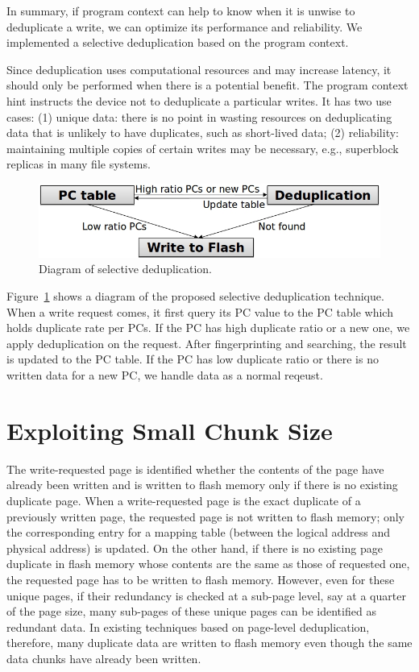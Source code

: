 In summary, if program context can help to
know when it is unwise to deduplicate a write, we can optimize
its performance and reliability. We implemented
a selective deduplication based on the program context.

Since deduplication uses computational resources
and may increase latency, it should only be performed
when there is a potential benefit. The program context
hint instructs the device not to deduplicate a particular
writes. It has two use cases:
(1) unique data: there is no point in wasting resources
on deduplicating data that is unlikely to have duplicates,
such as short-lived data; (2) reliability: maintaining
multiple copies of certain writes may be necessary,
e.g., superblock replicas in many file systems.

\begin{figure}[t]
	\center
	\includegraphics[scale=0.3]{figure/finededup/selectivededup}
	\caption{Diagram of selective deduplication.} %
	\label{fig:selectivededup}
\end{figure}

Figure~\ref{fig:selectivededup} shows a diagram of the proposed selective
deduplication technique. 
When a write request comes, it first query its PC value to the PC table which holds 
duplicate rate per PCs.
If the PC has high duplicate ratio or a new one, we apply deduplication on the request.
After fingerprinting and searching, the result is updated to the PC table.
If the PC has low duplicate ratio or there is no written data for a new PC,
we handle data as a normal reqeust.


\section{Exploiting Small Chunk Size }
\label{sec:finededup_motivation}

The write-requested page is identified whether the contents of the page have already been written and 
is written to flash memory only if there is no existing duplicate page. 
When a write-requested page is the exact duplicate of a previously written page, 
the requested page is not written to flash memory; 
only the corresponding entry for a mapping table (between the logical address and physical address) is updated. 
On the other hand, if there is no existing page duplicate in flash memory whose contents are the 
same as those of requested one, the requested page has to be written to flash memory. 
However, even for these unique pages, if their redundancy is checked at a sub-page level, 
say at a quarter of the page size, many sub-pages of these unique pages can be identified as redundant data. 
In existing techniques based on page-level deduplication, therefore, 
many duplicate data are written to flash memory even though the same data chunks have already been written.

